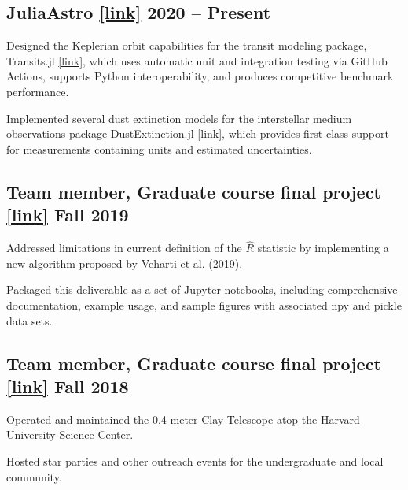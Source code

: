 \subsection[A]{JuliaAstro \href{https://juliaastro.github.io/dev/index.html}{[link]} \hfill 2020 -- Present}
\begin{zitemize}
\item Designed the Keplerian orbit capabilities for the transit modeling package, Transits.jl \href{https://juliaastro.github.io/Transits.jl/dev/}{[link]}, which uses automatic unit and integration testing via GitHub Actions, supports Python interoperability, and produces competitive benchmark performance.
\item Implemented several dust extinction models for the interstellar medium observations package DustExtinction.jl \href{https://juliaastro.github.io/DustExtinction.jl/stable/}{[link]}, which provides first-class support for measurements containing units and estimated uncertainties.
\end{zitemize}

\subsection[B]{Team member, Graduate course final project \href{https://github.com/icweaver/pyhat}{[link]} \hfill Fall 2019}
\begin{zitemize}
\item Addressed limitations in current definition of the $\hat R$ statistic by implementing a new algorithm proposed by Veharti et al. (2019).
\item Packaged this deliverable as a set of Jupyter notebooks, including comprehensive documentation, example usage, and sample figures with associated npy and pickle data sets.
\end{zitemize}

\subsection[C]{Team member, Graduate course final project \href{https://spacejam.readthedocs.io/en/latest/}{[link]} \hfill Fall 2018}
\begin{zitemize}
\item Operated and maintained the 0.4 meter Clay Telescope atop the Harvard University Science Center.
\item Hosted star parties and other outreach events for the undergraduate and local community.
\end{zitemize}